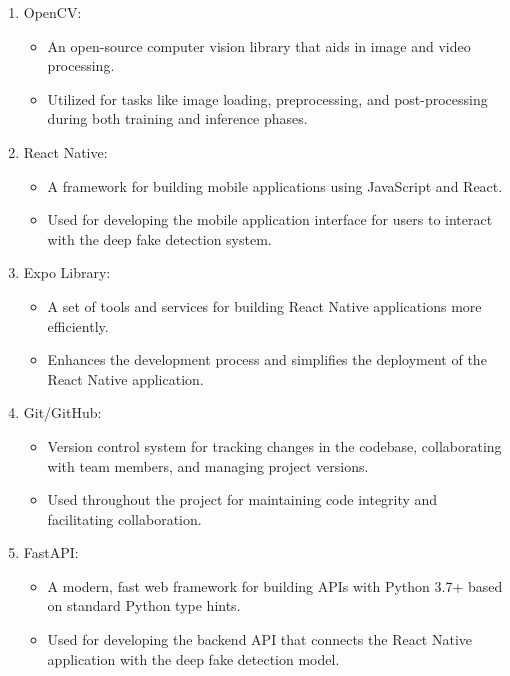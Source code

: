 \begin{enumerate}
    \item OpenCV:
          \begin{itemize}
              \item An open-source computer vision library that aids in image and video processing.
              \item Utilized for tasks like image loading, preprocessing, and post-processing during both training and inference phases.
          \end{itemize}

    \item React Native:
          \begin{itemize}
              \item A framework for building mobile applications using JavaScript and React.
              \item Used for developing the mobile application interface for users to interact with the deep fake detection system.
          \end{itemize}

    \item Expo Library:
          \begin{itemize}
              \item A set of tools and services for building React Native applications more efficiently.
              \item Enhances the development process and simplifies the deployment of the React Native application.
          \end{itemize}

    \item Git/GitHub:
          \begin{itemize}
              \item Version control system for tracking changes in the codebase, collaborating with team members, and managing project versions.
              \item Used throughout the project for maintaining code integrity and facilitating collaboration.
          \end{itemize}

    \item FastAPI:
          \begin{itemize}
              \item A modern, fast web framework for building APIs with Python 3.7+ based on standard Python type hints.
              \item Used for developing the backend API that connects the React Native application with the deep fake detection model.
          \end{itemize}

\end{enumerate}
\newpage